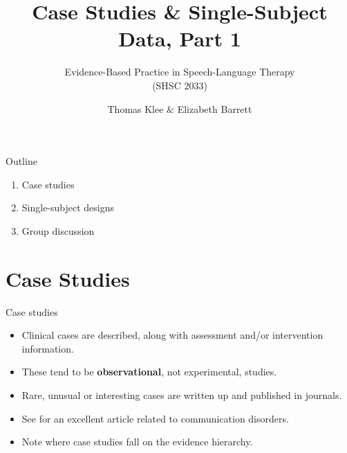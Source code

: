 \documentclass{beamer}
\title{Case Studies \& Single-Subject Data, Part 1}
\subtitle{}
\author{Evidence-Based Practice in Speech-Language Therapy \\ (SHSC 2033)}
\institute{Session 6}
\date{Thomas Klee \& Elizabeth Barrett}
\begin{document}
\begin{frame}
	\titlepage
\end{frame}

% 
\begin{frame}{Outline}
	\begin{enumerate}
	\item Case studies
	\item Single-subject designs
	\item Group discussion
	\end {enumerate}
\end{frame}

\section*{Case Studies}

%
\begin{frame}
\center{\Huge{\textcolor{darkgray}{Case Studies}}}
\end{frame}

% 
\begin{frame}{Case studies}
	\begin{itemize}
	\item Clinical cases are described, along with assessment and/or intervention information.
	\item These tend to be \textbf{observational}, not experimental, studies.
	\item Rare, unusual or interesting cases are written up and published in journals.
	\item See \citet{Crystal1987} for an excellent article related to communication disorders.
	\item Note where case studies fall on the evidence hierarchy.
	\end{itemize}
\end{frame}
\end{document}
